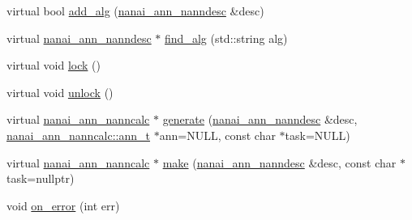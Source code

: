 \begin{DoxyCompactItemize}
virtual bool \hyperlink{classnanai_1_1nanai__ann__nannmgr_aaf4b292087f8f3f48f6a77140dd512ca}{add\+\_\+alg} (\hyperlink{namespacenanai_a892a8c80381d0005a076b68fbbf2d918}{nanai\+\_\+ann\+\_\+nanndesc} \&desc)
\item 
virtual \hyperlink{namespacenanai_a892a8c80381d0005a076b68fbbf2d918}{nanai\+\_\+ann\+\_\+nanndesc} $\ast$ \hyperlink{classnanai_1_1nanai__ann__nannmgr_aa3fdb4c566c9f8b670631fb559cf1b02}{find\+\_\+alg} (std\+::string alg)
\item 
virtual void \hyperlink{classnanai_1_1nanai__ann__nannmgr_ad67bf88a3df568c5ed07c2adca863be8}{lock} ()
\item 
virtual void \hyperlink{classnanai_1_1nanai__ann__nannmgr_a061504e906faa17ab8cfeccb0f6c17bf}{unlock} ()
\item 
virtual \hyperlink{classnanai_1_1nanai__ann__nanncalc}{nanai\+\_\+ann\+\_\+nanncalc} $\ast$ \hyperlink{classnanai_1_1nanai__ann__nannmgr_a66d329677b38c6d967a737adabaae13e}{generate} (\hyperlink{namespacenanai_a892a8c80381d0005a076b68fbbf2d918}{nanai\+\_\+ann\+\_\+nanndesc} \&desc, \hyperlink{classnanai_1_1nanai__ann__nanncalc_1_1ann__t}{nanai\+\_\+ann\+\_\+nanncalc\+::ann\+\_\+t} $\ast$ann=N\+U\+L\+L, const char $\ast$task=N\+U\+L\+L)
\item 
virtual \hyperlink{classnanai_1_1nanai__ann__nanncalc}{nanai\+\_\+ann\+\_\+nanncalc} $\ast$ \hyperlink{classnanai_1_1nanai__ann__nannmgr_ab67ff07d5336bc219b5579d540caef3b}{make} (\hyperlink{namespacenanai_a892a8c80381d0005a076b68fbbf2d918}{nanai\+\_\+ann\+\_\+nanndesc} \&desc, const char $\ast$task=nullptr)
\item 
void \hyperlink{classnanai_1_1nanai__ann__nannmgr_a28ea36058e9dfd5ce6b80d6011931acc}{on\+\_\+error} (int err)
\end{DoxyCompactItemize}
